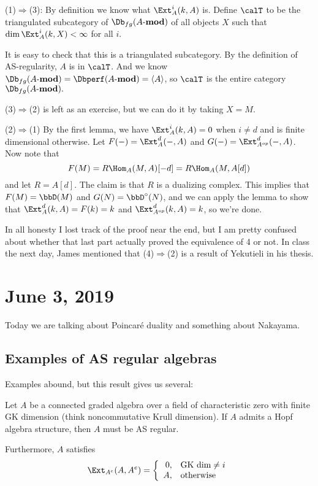\documentclass[12pt]{article}
\newcommand*{\Amod}{A\text{-}\mathbf{mod}}
\begin{document}
\begin{prf}[of theorem]
	(1)$\Rightarrow$(3): By definition we know what $\Ext_A^i(k,A)$ is. Define $\calT$ to be the triangulated subcategory of 
	$\Db_{fg}(\Amod)$ of all objects $X$ such that $\dim\Ext_A^i(k,X)<\infty$ for all $i$.

	It is easy to check that this is a triangulated subcategory. By the definition of AS-regularity, $A$ is in $\calT$. And we know $\Db_{fg}(\Amod)=\Dbperf(\Amod)=\langle A\rangle$, so $\calT$ is 
	the entire category $\Db_{fg}(\Amod).$

	\brk

	(3)$\Rightarrow$(2) is left as an exercise, but we can do it by taking $X=M$.

	\brk

	(2)$\Rightarrow$(1) By the first lemma, we have $\Ext_A^i(k,A)=0$ when $i\ne d$ and is finite dimensional otherwise.
	Let $F(-)=\Ext_A^d(-,A)$ and $G(-)=\Ext^d_{A^{op}}(-,A)$. Now note that 
	\[F(M)=R\Hom_A(M,A)[-d]=R\Hom_A(M,A[d])\]
	and let $R=A[d]$. The claim is that $R$ is a dualizing complex. This implies that $F(M)=\bbD(M)$ and $G(N)=\bbD^\circ(N)$,
	and we can apply the lemma to show that $\Ext_A^d(k,A)=F(k)=k$ and $\Ext_{A^{op}}^d(k,A)=k$, so we're done.
\end{prf}	
\begin{rmk}
	In all honesty I lost track of the proof near the end, but I am pretty confused about whether that last part actually proved the equivalence of 4 or not.
	In class the next day, James mentioned that (4)$\Rightarrow$(2) is a result of Yekutieli in his thesis.
\end{rmk}

\section{June 3, 2019}
Today we are talking about Poincar\'e duality and something about Nakayama.
\subsection{Examples of AS regular algebras}
Examples abound, but this result gives us several:
\begin{thm}[Brown]
	Let $A$ be a connected graded algebra over a field of characteristic zero with finite GK dimension (think noncommutative Krull dimension). If $A$ admits a Hopf 
	algebra structure, then $A$ must be AS regular.

	Furthermore, $A$ satisfies 
\[\Ext_{A^e}(A,A^e)=\left\{\begin{array}{rl}
	0, & \text{GK dim}\ne i\\
	A,&\text{otherwise}\end{array}\right.\]
\end{thm}
\end{document}
